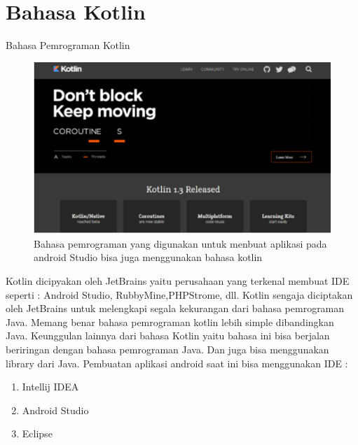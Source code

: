 \section{Bahasa Kotlin}
\hfill \break
Bahasa Pemrograman Kotlin
\begin{figure}[!htbp]
  \centering
  \includegraphics[width=.75\textwidth]{figures/Kotlin.png}
  \caption{Bahasa pemrograman yang digunakan untuk menbuat aplikasi pada android Studio bisa juga menggunakan bahasa kotlin}\label{fig:error}
\end{figure}
\hfill \break
Kotlin dicipyakan oleh JetBrains yaitu perusahaan yang terkenal membuat IDE seperti : Android Studio, RubbyMine,PHPStrome, dll.
\hfill \break
Kotlin sengaja diciptakan oleh JetBrains untuk melengkapi segala kekurangan dari bahasa pemrograman Java. Memang benar bahasa pemrograman kotlin lebih simple dibandingkan Java.
\hfill \break
Keunggulan lainnya dari bahasa Kotlin yaitu bahasa ini bisa berjalan beriringan dengan bahasa pemrograman Java. Dan juga bisa menggunakan library dari Java.
\hfill \break
Pembuatan aplikasi android saat ini bisa menggunakan IDE :
\begin{enumerate}
\item Intellij IDEA
\item Android Studio
\item Eclipse
\end{enumerate}